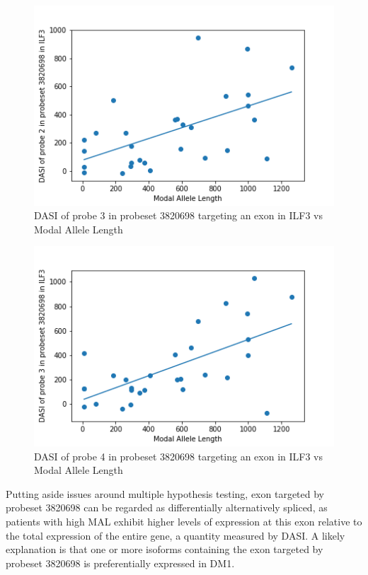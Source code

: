 \begin{figure}
	\centering
	\includegraphics[width=135mm]{probeILF32.png}
	\caption{DASI of probe 3 in probeset 3820698 targeting an exon in ILF3 vs Modal Allele Length}
    \label{probeILF32}
\end{figure}

\begin{figure}
	\centering
	\includegraphics[width=135mm]{probeILF33.png} \caption{DASI of probe 4 in probeset 3820698 targeting an exon in ILF3 vs Modal Allele Length}
    \label{probeILF33}
\end{figure}

Putting aside issues around multiple hypothesis testing, exon targeted by probeset 3820698 can be regarded as differentially alternatively spliced, as patients with high MAL exhibit higher levels of expression at this exon relative to the total expression of the entire gene, a quantity measured by DASI. A likely explanation is that one or more isoforms containing the exon targeted by probeset 3820698 is preferentially expressed in DM1.

